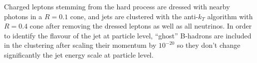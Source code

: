Charged leptons stemming from the hard process are dressed with nearby photons in a $R=0.1$ cone, and jets are clustered with the anti-$k_T$ algorithm with  $R=0.4$ cone after removing the dressed leptons as well as all neutrinos. In order to identify the flavour of the jet at particle level, ``ghost'' B-hadrons are included in the clustering after scaling their momentum by $10^{-20}$ so they don't change significantly the jet energy scale at particle level.
